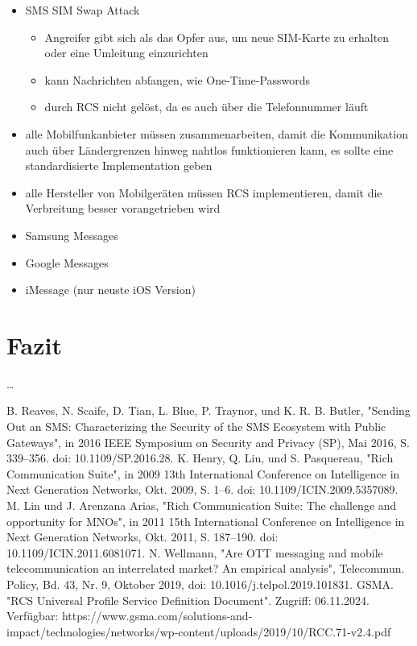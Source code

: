 \documentclass[conference]{IEEEtran}
\begin{document}
\begin{itemize}
    \item SMS SIM Swap Attack
          \begin{itemize}
              \item Angreifer gibt sich als das Opfer aus, um neue SIM-Karte zu erhalten oder eine Umleitung einzurichten
              \item kann Nachrichten abfangen, wie One-Time-Passwords
              \item durch RCS nicht gelöst, da es auch über die Telefonnummer läuft
          \end{itemize}
\end{itemize}
\cite{sendoutsms}

\begin{itemize}
    \item alle Mobilfunkanbieter müssen zusammenarbeiten, damit die Kommunikation auch über Ländergrenzen hinweg nahtlos funktionieren kann, es sollte eine standardisierte Implementation geben
    \item alle Hersteller von Mobilgeräten müssen RCS implementieren, damit die Verbreitung besser vorangetrieben wird
\end{itemize}
\cite{rcsmno}

\begin{itemize}
    \item Samsung Messages
    \item Google Messages
    \item iMessage (nur neuste iOS Version)
\end{itemize}

\section{Fazit}

\dots

\begin{thebibliography}{00}
     B. Reaves, N. Scaife, D. Tian, L. Blue, P. Traynor, und K. R. B. Butler, "Sending Out an SMS: Characterizing the Security of the SMS Ecosystem with Public Gateways", in 2016 IEEE Symposium on Security and Privacy (SP), Mai 2016, S. 339–356. doi: 10.1109/SP.2016.28.
     K. Henry, Q. Liu, und S. Pasquereau, "Rich Communication Suite", in 2009 13th International Conference on Intelligence in Next Generation Networks, Okt. 2009, S. 1–6. doi: 10.1109/ICIN.2009.5357089.
     M. Lin und J. Arenzana Arias, "Rich Communication Suite: The challenge and opportunity for MNOs", in 2011 15th International Conference on Intelligence in Next Generation Networks, Okt. 2011, S. 187–190. doi: 10.1109/ICIN.2011.6081071.
     N. Wellmann, "Are OTT messaging and mobile telecommunication an interrelated market? An empirical analysis", Telecommun. Policy, Bd. 43, Nr. 9, Oktober 2019, doi: 10.1016/j.telpol.2019.101831.
     GSMA. "RCS Universal Profile Service Definition Document". Zugriff: 06.11.2024. Verfügbar: https://www.gsma.com/solutions-and-impact/technologies/networks/wp-content/uploads/2019/10/RCC.71-v2.4.pdf
\end{thebibliography}
\end{document}
